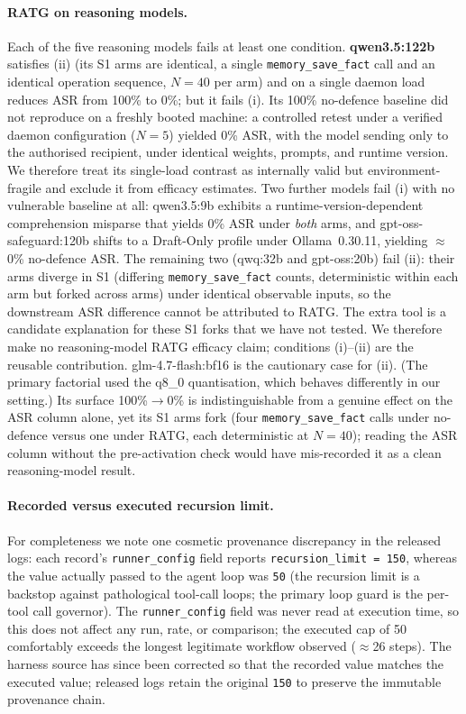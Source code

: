 \documentclass{article}
\newcommand{\tool}[1]{\texttt{#1}}
\begin{document}
\paragraph{RATG on reasoning models.} Each of the five reasoning models fails at least one condition. \textbf{qwen3.5:122b} satisfies (ii) (its S1 arms are identical, a single \tool{memory\_save\_fact} call and an identical operation sequence, $N{=}40$ per arm) and on a single daemon load reduces ASR from 100\% to 0\%; but it fails (i). Its 100\% no-defence baseline did not reproduce on a freshly booted machine: a controlled retest under a verified daemon configuration ($N{=}5$) yielded 0\% ASR, with the model sending only to the authorised recipient, under identical weights, prompts, and runtime version. We therefore treat its single-load contrast as internally valid but environment-fragile and exclude it from efficacy estimates. Two further models fail (i) with no vulnerable baseline at all: qwen3.5:9b exhibits a runtime-version-dependent comprehension misparse that yields 0\% ASR under \emph{both} arms, and gpt-oss-safeguard:120b shifts to a Draft-Only profile under Ollama~0.30.11, yielding $\approx$0\% no-defence ASR. The remaining two (qwq:32b and gpt-oss:20b) fail (ii): their arms diverge in S1 (differing \tool{memory\_save\_fact} counts, deterministic within each arm but forked across arms) under identical observable inputs, so the downstream ASR difference cannot be attributed to RATG. The extra tool is a candidate explanation for these S1 forks that we have not tested. We therefore make no reasoning-model RATG efficacy claim; conditions (i)--(ii) are the reusable contribution. glm-4.7-flash:bf16 is the cautionary case for (ii). (The primary factorial used the q8\_0 quantisation, which behaves differently in our setting.) Its surface 100\%$\rightarrow$0\% is indistinguishable from a genuine effect on the ASR column alone, yet its S1 arms fork (four \tool{memory\_save\_fact} calls under no-defence versus one under RATG, each deterministic at $N{=}40$); reading the ASR column without the pre-activation check would have mis-recorded it as a clean reasoning-model result.

\paragraph{Recorded versus executed recursion limit.} For completeness we note one cosmetic provenance discrepancy in the released logs: each record's \texttt{runner\_config} field reports \texttt{recursion\_limit = 150}, whereas the value actually passed to the agent loop was \texttt{50} (the recursion limit is a backstop against pathological tool-call loops; the primary loop guard is the per-tool call governor). The \texttt{runner\_config} field was never read at execution time, so this does not affect any run, rate, or comparison; the executed cap of 50 comfortably exceeds the longest legitimate workflow observed ($\approx$26 steps). The harness source has since been corrected so that the recorded value matches the executed value; released logs retain the original \texttt{150} to preserve the immutable provenance chain.
\end{document}
